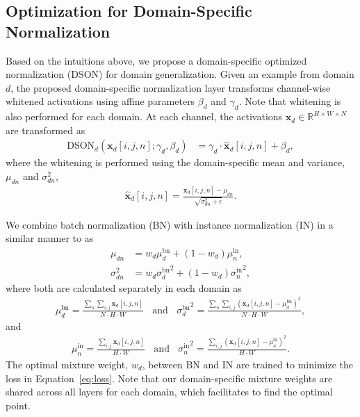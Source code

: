 \documentclass[runningheads]{llncs}
\begin{document}
\subsection{Optimization for Domain-Specific Normalization}
\label{sub:dson}
{\color{black}
Based on the intuitions above, we propose a domain-specific optimized normalization (DSON) for domain generalization.}
Given an example from domain $d$, the proposed domain-specific normalization layer transforms channel-wise whitened activations using affine parameters $\beta_d$ and $\gamma_d$.
{\color{black}Note that whitening is also performed for each domain.}
At each channel, the activations $\mathbf{x}_d \in \mathbb{R}^{H\times W\times N}$ are transformed as
\begin{align}
\text{DSON}_d(\mathbf{x}_d[i, j, n] ; \gamma_d, \beta_d) &= \gamma_d \cdot \hat{\mathbf{x}}_d [i, j, n] + \beta_d,
\end{align}
where the whitening is performed using the domain-specific mean and variance, $\mu_{dn}$ and $\sigma_{dn}^2$,
\begin{align}
\hat{\mathbf{x}}_d[i, j, n] =  \frac{\mathbf{x}_d[i, j, n] - \mu_{dn}}{\sqrt{\sigma_{dn}^{2} + \epsilon}}.
\end{align}

We combine batch normalization (BN) with instance normalization (IN) in a similar manner to \cite{sn} as
\begin{align}
\mu_{dn} &= w_{d}\mu^{\text{bn}}_{d} + (1-w_{d})\mu^{\text{in}}_{n},\\
\sigma_{dn}^2 &= w_{d}\sigma{^{\text{bn}}_d}^2 + (1-w_{d})\sigma{^{\text{in}}_n}^2,
\end{align}
where both are calculated separately in each domain as
\begin{align}
\mu^{\text{bn}}_{d} = \frac{\sum_n \sum_{i,j} \mathbf{x}_d[i,j, n]}{N \cdot H \cdot W}~~~~\text{and}~~~~
\sigma{^{\text{bn}}_{d}}^2 = \frac{\sum_n \sum_{i,j} \left( \mathbf{x}_d[i, j, n] - \mu^{\text{bn}}_{d} \right)^2 }{N \cdot H \cdot W},
\end{align}
and
\begin{align}
\mu^{\text{in}}_{n} = \frac{\sum_{i,j} \mathbf{x}_d[i,j, n]}{H \cdot W}~~~~\text{and}~~~~
\sigma{^{\text{in}}_{n}}^2 = \frac{\sum_{i,j} \left( \mathbf{x}_d[i, j, n] - \mu^{\text{in}}_{n} \right)^2 }{H \cdot W}.
\end{align}
The optimal mixture weight, $w_d$, between BN and IN are trained to minimize the loss in Equation~\ref{eq:loss}.
Note that our domain-specific mixture weights are shared across all layers for each domain, which facilitates to find the optimal point.
\end{document}
